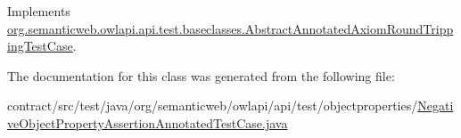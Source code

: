 Implements \hyperlink{classorg_1_1semanticweb_1_1owlapi_1_1api_1_1test_1_1baseclasses_1_1_abstract_annotated_axiom_round_tripping_test_case_a6afbb12cdaa7995823a6bb2a3a60ba8c}{org.\-semanticweb.\-owlapi.\-api.\-test.\-baseclasses.\-Abstract\-Annotated\-Axiom\-Round\-Tripping\-Test\-Case}.



The documentation for this class was generated from the following file\-:\begin{DoxyCompactItemize}
\item 
contract/src/test/java/org/semanticweb/owlapi/api/test/objectproperties/\hyperlink{_negative_object_property_assertion_annotated_test_case_8java}{Negative\-Object\-Property\-Assertion\-Annotated\-Test\-Case.\-java}\end{DoxyCompactItemize}
